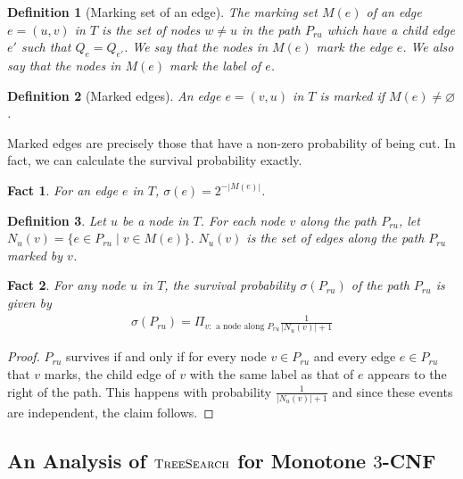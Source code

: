 \documentclass[10pt,a4paper]{article}
\let\emptyset\varnothing
\newtheorem{fact}{Fact}
\newtheorem{definition}{Definition}
\newcommand{\ts}{\textsc{TreeSearch}}
\begin{document}
\begin{definition}[Marking set of an  edge]
The \emph{marking set} $M(e)$ of an edge $e=(u,v)$ in $T$ is the set of
nodes $w\neq u$ in the path $P_{ru}$ which have a child edge $e'$ such that $Q_e=Q_{e'}$.
We say that the nodes in $M(e)$ mark the edge $e$.
We also say that the nodes in $M(e)$ mark the label of $e$. 
\end{definition}

\begin{definition}[Marked edges]
An edge $e=(v,u)$ in $T$ is \emph{marked}
if $M(e)\neq \emptyset$. 
\end{definition}

Marked edges are precisely those that have a non-zero probability of being cut. In fact, we can calculate the survival probability exactly.


\begin{fact}
For an edge $e$ in $T$,  $\sigma(e) = 2^{-|M(e)|}$.
\end{fact}

\begin{definition}
Let $u$ be a node in $T$. For each node $v$ 
along the path $P_{ru}$, let $N_u(v) = \{e\in P_{ru} \mid v\in M(e)\}$.
$N_u(v)$ is the set of edges along the path $P_{ru}$ marked by $v$.
\end{definition}

\begin{fact}
\label{fact:path-prob}
For any node $u$ in $T$,
the survival probability $\sigma(P_{ru})$ of the path $P_{ru}$
is given by 
\begin{align*}
\sigma(P_{ru}) = \Pi_{v: \text{ a node along }  P_{ru}} \frac{1}{|N_u(v)|+1}
\end{align*}
\end{fact}

\begin{proof}
$P_{ru}$ survives if and only if for every node $v \in P_{ru}$ and every 
edge $e \in P_{ru}$ that $v$ marks, 
the child edge of $v$ with the same label as that of $e$ appears to the right of the path. This happens with probability $\frac{1}{|N_u(v)| + 1}$ and since these events are independent, the claim follows.
\end{proof}


\subsection{An Analysis of $\ts$ for Monotone $3$-CNF}
\end{document}
